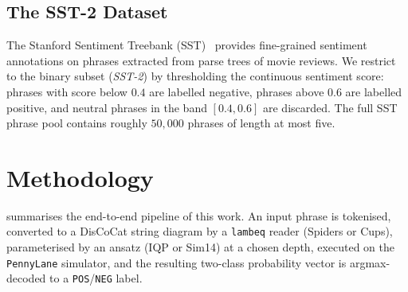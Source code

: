 \documentclass[runningheads]{llncs}
\begin{document}
\subsection{The SST-2 Dataset}

The Stanford Sentiment Treebank (SST)~\cite{socher2013} provides fine-grained
sentiment annotations on phrases extracted from parse trees of movie
reviews. We restrict to the binary subset (\emph{SST-2}) by thresholding the
continuous sentiment score: phrases with score below \(0.4\) are labelled
negative, phrases above \(0.6\) are labelled positive, and neutral phrases
in the band \([0.4,0.6]\) are discarded. The full SST phrase pool contains
roughly \(50{,}000\) phrases of length at most five.

\section{Methodology}\label{sec:method}

 summarises the end-to-end pipeline of this work. An
input phrase is tokenised, converted to a DisCoCat string diagram by a
\texttt{lambeq} reader (Spiders or Cups), parameterised by an ansatz (IQP
or Sim14) at a chosen depth, executed on the \texttt{PennyLane} simulator,
and the resulting two-class probability vector is argmax-decoded to a
\texttt{POS}/\texttt{NEG} label.
\end{document}
